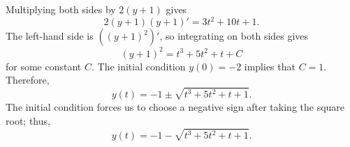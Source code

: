 \documentclass{homework}
\begin{document}
	\begin{arabicparts}
		\questionpart Multiplying both sides by $2(y+1)$ gives
		\begin{equation}
			2(y+1)(y+1)' = 3t^2+10t+1.
		\end{equation}
		The left-hand side is $\left((y+1)^2\right)'$, so integrating on both sides gives
		\begin{equation}
			(y+1)^2 = t^3+5t^2+t+C
		\end{equation}
		for some constant $C$. The initial condition $y(0) = -2$ implies that $C = 1$. Therefore,
		\begin{equation}
			y(t) = -1 \pm \sqrt{t^3+5t^2+t+1}.
		\end{equation}
		The initial condition forces us to choose a negative sign after taking the square root; thus,
		\begin{equation}
			y(t) = -1 - \sqrt{t^3+5t^2+t+1}.
		\end{equation}
		
	\end{arabicparts}
\end{document}
